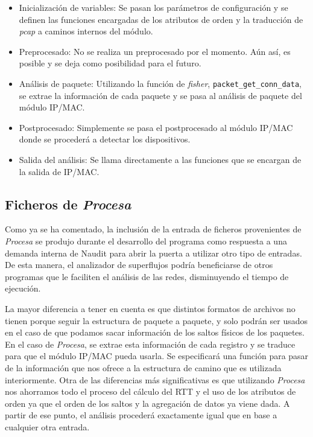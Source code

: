 \documentclass[tfg,epsbased,lof,lot,loa,final,nocopyright,overleaf]{tfgtfmthesisuam}
\begin{document}
\begin{itemize}
	\item{Inicialización de variables: }Se pasan los parámetros de configuración y se definen las funciones encargadas de los atributos de orden y la traducción de \textit{pcap} a caminos internos del módulo.
	\item{Preprocesado: }No se realiza un preprocesado por el momento. Aún así, es posible y se deja como posibilidad para el futuro.
	\item{Análisis de paquete: }Utilizando la función de \textit{fisher}, \texttt{packet\_get\_conn\_data}, se extrae la información de cada paquete y se pasa al análisis de paquete del módulo IP/MAC.
	\item{Postprocesado: }Simplemente se pasa el postprocesado al módulo IP/MAC donde se procederá a detectar los dispositivos.
	\item{Salida del análisis: }Se llama directamente a las funciones que se encargan de la salida de IP/MAC.
\end{itemize}

\subsection{Ficheros de \textit{Procesa}}
Como ya se ha comentado, la inclusión de la entrada de ficheros provenientes de \textit{Procesa} se produjo durante el desarrollo del programa como respuesta a una demanda interna de Naudit para abrir la puerta a utilizar otro tipo de entradas. De esta manera, el analizador de superflujos podría beneficiarse de otros programas que le faciliten el análisis de las redes, disminuyendo el tiempo de ejecución. 

La mayor diferencia a tener en cuenta es que distintos formatos de archivos no tienen porque seguir la estructura de paquete a paquete, y solo podrán ser usados en el caso de que podamos sacar información de los saltos físicos de los paquetes. En el caso de \textit{Procesa}, se extrae esta información de cada registro y se traduce para que el módulo IP/MAC pueda usarla. Se especificará una función para pasar de la información que nos ofrece a la estructura de camino que es utilizada interiormente. Otra de las diferencias más significativas es que utilizando \textit{Procesa} nos ahorramos todo el proceso del cálculo del RTT y el uso de los atributos de orden ya que el orden de los saltos y la agregación de datos ya viene dada. A partir de ese punto, el análisis procederá exactamente igual que en base a cualquier otra entrada.
\end{document}
